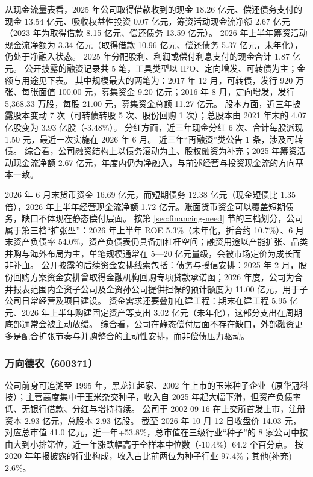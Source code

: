  从现金流量表看，2025 年公司取得借款收到的现金 18.26 亿元、偿还债务支付的现金 13.54 亿元、吸收权益性投资 0.07 亿元，筹资活动现金流净额 2.67 亿元（2023 年为取得借款 8.15 亿元、偿还债务 13.59 亿元）。 2026 年上半年筹资活动现金流净额为 3.34 亿元（取得借款 10.96 亿元、偿还债务 5.37 亿元，未年化），仍处于净融入状态。 2025 年分配股利、利润或偿付利息支付的现金合计 1.87 亿元。 公开披露的融资记录共 5 笔，工具类型以 IPO、定向增发、可转债为主；金额与用途见下表。 其中规模最大的两笔为：2017 年 12 月，可转债，发行 920 万张、每张面值 100.00 元，募集资金 9.20 亿元；2016 年 8 月，定向增发，发行 5,368.33 万股，每股 21.00 元，募集资金总额 11.27 亿元。 股本方面，近三年披露股本变动 7 次（可转债转股 5 次、股份回购 1 次）；总股本由 2021 年末的 4.07 亿股变为 3.93 亿股（-3.48\%）。 分红方面，近三年现金分红 6 次、合计每股派现 1.50 元，最近一次实施在 2026 年 6 月。 近三年“再融资”类公告 1 条，涉及可转债。 综合看，公司融资结构上以债务滚动为主、股权融资为补充；2025 年筹资活动现金流净额 2.67 亿元，年度内仍为净融入，与前述经营与投资现金流的方向基本一致。

 2026 年 6 月末货币资金 16.69 亿元，而短期债务 12.38 亿元（现金短债比 1.35 倍），2026 年上半年经营现金流净额 1.72 亿元。账面货币资金可以覆盖短期债务，缺口不体现在静态偿付层面。 按第 \ref{sec:financing-need} 节的三档划分，公司属于第三档“扩张型”：2026 年上半年 ROE 5.3\%（未年化，折合约 10.7\%）、6 月末资产负债率 54.0\%，资产负债表仍具备加杠杆空间；融资用途以产能扩张、品类并购与海外布局为主，单笔规模通常在 5---20 亿元量级，会被市场定价为成长而非补血。 公开披露的后续资金安排线索包括：债务与授信安排：2025 年 2 月，股份回购方案资金安排曾取得金融机构回购专项贷款承诺函；2026 年度，公司为合并报表范围内全资子公司及全资孙公司提供担保的预计额度为 11.00 亿元，用于子公司日常经营及项目建设。 资金需求还要叠加在建工程：期末在建工程 5.95 亿元、2026 年上半年购建固定资产等支出 3.02 亿元（未年化），这部分支出在周期底部通常会被主动放缓。 综合看，公司在静态偿付层面不存在缺口，外部融资更多是配合扩张节奏与并购整合的主动性安排，而非偿债压力驱动。




\subsubsection{万向德农（600371）}
\label{co:600371}

 公司前身可追溯至 1995 年，黑龙江起家、2002 年上市的玉米种子企业（原华冠科技）；主营高度集中于玉米杂交种子，收入自 2025 年起大幅下滑，但资产负债率低、无银行借款、分红与增持持续。 公司于 2002-09-16 在上交所首发上市，注册资本 2.93 亿元，总股本 2.93 亿股。 截至 2026 年 10 月 12 日收盘价 14.03 元，对应总市值 41.0 亿元，近一年+53.8\%，总市值在三级行业“种子”的 8 家公司中按由大到小排第位，近一年涨跌幅高于全样本中位数（-10.4\%）64.2 个百分点。 按 2020 年年报披露的行业构成，收入占比前两位为种子行业 97.4\%；其他(补充) 2.6\%。

